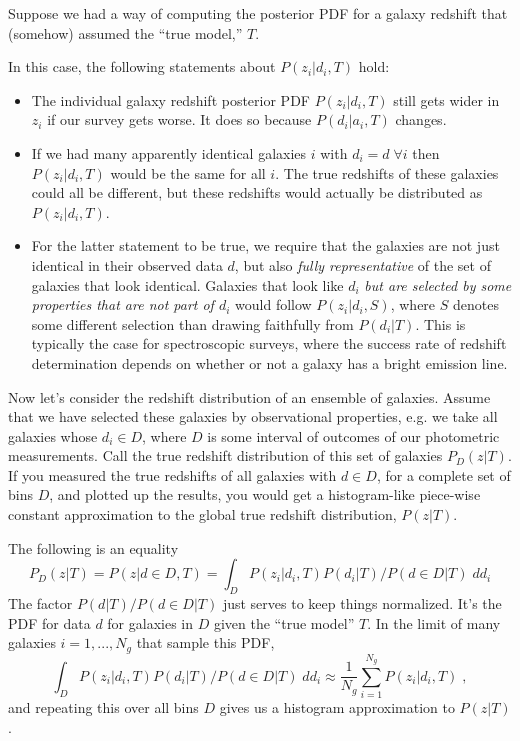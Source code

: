\documentclass[11pt]{amsart}
\begin{document}
Suppose we had a way of computing the posterior PDF for a galaxy redshift that (somehow) assumed the ``true model,'' $T$.

In this case, the following statements about $P(z_i|d_i, T)$ hold:
\begin{itemize}
\item The individual galaxy redshift posterior PDF $P(z_i|d_i, T)$ still gets wider in $z_i$ if our survey gets worse. It does so because $P(d_i|a_i,T)$ changes.
\item If we had many apparently identical galaxies $i$ with $d_i=d \; \forall i$ then $P(z_i|d_i, T)$ would be the same for all $i$. The true redshifts of these galaxies could all be different, but these redshifts would actually be distributed as $P(z_i|d_i, T)$.
\item For the latter statement to be true, we require that the galaxies are not just identical in their observed data $d$, but also \emph{fully representative} of the set of galaxies that look identical. Galaxies that look like $d_i$ {\it but are selected by some properties that are not part of $d_i$} would follow $P(z_i|d_i, S)$, where $S$ denotes some different selection than drawing faithfully from $P(d_i|T)$.
This is typically the case for spectroscopic surveys, where the success rate of redshift determination depends on whether or not a galaxy has a bright emission line.
\end{itemize}

Now let's consider the redshift distribution of an ensemble of galaxies.
Assume that we have selected these galaxies by observational properties,
e.g. we take all galaxies whose $d_i\in D$, where $D$ is some interval
of outcomes of our photometric measurements. Call the true redshift
distribution of this set of galaxies $P_D(z|T)$. If you measured the
true redshifts of all galaxies with $d\in D$, for a complete set of bins
$D$, and plotted up the results, you would get a histogram-like
piece-wise constant approximation to the global true redshift
distribution, $P(z|T)$.

The following is an equality
\begin{equation}
P_D(z|T) = P(z|d\in D, T) = \int_{D} P(z_i|d_i, T) P(d_i|T) / P(d\in D|T) \; d d_i
\end{equation}
The factor $P(d|T)/P(d\in D|T)$ just serves to keep things normalized. It's the PDF for data $d$ for galaxies in $D$ given the ``true model'' $T$. In the limit of many galaxies $i=1,...,N_g$ that sample this PDF,
\begin{equation}
\int_{D} P(z_i|d_i,T) P(d_i|T) / P(d\in D|T) \; d d_i \approx \frac{1}{N_g} \sum_{i=1}^{N_g} P(z_i | d_i, T) \; ,
\end{equation}
and repeating this over all bins $D$ gives us a histogram approximation to $P(z|T)$.
\end{document}
